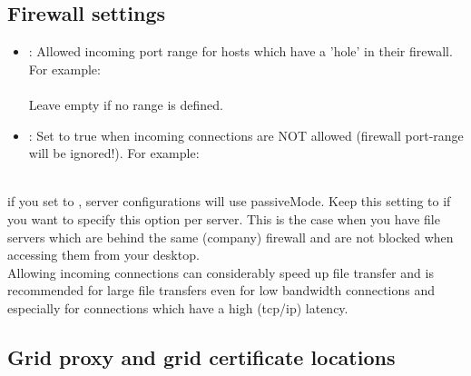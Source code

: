 \subsection{Firewall settings}
\begin{itemize}  
   \item {}: Allowed incoming port range for
   hosts which have a 'hole' in their firewall. For example:\\
    
   \tab {}\\
   
   Leave empty if no range is defined.\\
     
   \item {}: Set to true when incoming connections are NOT
   allowed (firewall port-range will be ignored!). For example:\\

   \tab {}\\
  
\end{itemize} 
 if you set  to ,  server 
configurations will use passiveMode. Keep this setting to  if
you want to specify this option per server. This is the case when you have
file servers which are behind the same (company) firewall and are not blocked
when accessing them from your desktop.\\

 Allowing incoming connections can considerably speed up
file transfer and is recommended for large file transfers even for low bandwidth
connections and especially for connections which have a high (tcp/ip) latency. 

\subsection{Grid proxy and grid certificate locations}
\label{sec:grid_proxy_configuration}

